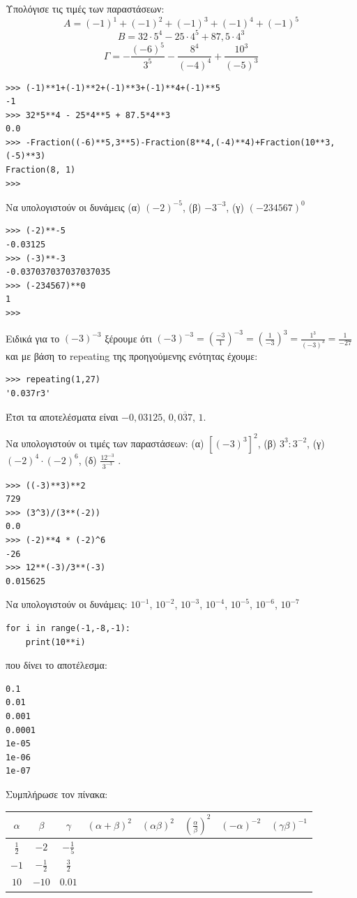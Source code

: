 \begin{exercise}
Υπολόγισε τις τιμές των παραστάσεων:
$$A = (-1)^1+(-1)^2+(-1)^3+(-1)^4+(-1)^5$$
$$B =32\cdot 5^4 - 25\cdot 4^5 + 87,5\cdot 4^3$$
$$\Gamma = -\frac{(-6)^5}{3^5}-\frac{8^4}{(-4)^4}+\frac{10^3}{(-5)^3}$$
\end{exercise}
\begin{lstlisting}
>>> (-1)**1+(-1)**2+(-1)**3+(-1)**4+(-1)**5
-1
>>> 32*5**4 - 25*4**5 + 87.5*4**3
0.0
>>> -Fraction((-6)**5,3**5)-Fraction(8**4,(-4)**4)+Fraction(10**3,(-5)**3)
Fraction(8, 1)
>>>
\end{lstlisting}
\begin{exercise}
Να υπολογιστούν οι δυνάμεις (α) $(-2)^{-5}$, (β) $-3^{-3}$, (γ) $(-234567)^0$
\end{exercise}
\begin{lstlisting}
>>> (-2)**-5
-0.03125
>>> (-3)**-3
-0.037037037037037035
>>> (-234567)**0
1
>>>
\end{lstlisting}
Ειδικά για το $(-3)^{-3}$ ξέρουμε ότι $(-3)^{-3}=\left(\frac{-3}{1}\right)^{-3}=\left(\frac{1}{-3}\right)^{3}=\frac{1^3}{(-3)^3}=\frac{1}{-27}$
και με βάση το repeating της προηγούμενης ενότητας έχουμε:
\begin{lstlisting}
>>> repeating(1,27)
'0.037r3'
\end{lstlisting}
Έτσι τα αποτελέσματα είναι $-0,03125$, $0,\overline{037}$, $1$.
\begin{exercise}
Να	υπολογιστούν	οι	τιμές	των	παραστάσεων:
(α)	 $[(-3)^3]^2$,			(β)	$3^3	:	3^{-2}$,			(γ)	$(-2)^4 \cdot (-2)^6$,			(δ)	 $\frac{12^{-3}}{3^{-3}}$ .
\end{exercise}
\begin{lstlisting}
>>> ((-3)**3)**2
729
>>> (3^3)/(3**(-2))
0.0
>>> (-2)**4 * (-2)^6
-26
>>> 12**(-3)/3**(-3)
0.015625
\end{lstlisting}
\begin{exercise}
Να	υπολογιστούν	οι	δυνάμεις:	$10^{-1}$, $10^{-2}$, $10^{-3}$, $10^{-4}$, $10^{-5}$, $10^{-6}$, $10^{-7}$
\end{exercise}
\begin{lstlisting}
for i in range(-1,-8,-1):
    print(10**i)
\end{lstlisting}
που δίνει το αποτέλεσμα:
\begin{lstlisting}
0.1
0.01
0.001
0.0001
1e-05
1e-06
1e-07
\end{lstlisting}
\begin{exercise}
Συμπλήρωσε	τον	πίνακα:
\begin{table}[ht]
\begin{tabular}{|c|c|c|c|c|c|c|c|}
\hline
$\alpha$&$\beta$&$\gamma$&$(\alpha+\beta)^2$&$(\alpha\beta)^2$&$\left(\frac{\alpha}{\beta}\right)^2$&$(-\alpha)^{-2}$&$(\gamma\beta)^{-1}$\\\hline
$\frac{1}{2}$&$-2$&$-\frac{1}{5}$&&&&&\\\hline
$-1$&$-\frac{1}{2}$&$\frac{3}{2}$&&&&&\\\hline
$10$&$-10$&$0.01$&&&&&\\\hline
\end{tabular}
\end{table}
\end{exercise}
